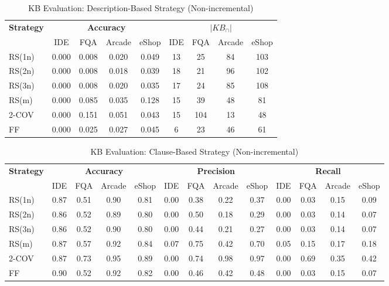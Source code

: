 \documentclass[11pt]{article}
\begin{document}
\begin{table}[htbp]
\centering
\caption{KB Evaluation: Description-Based Strategy (Non-incremental)}
\label{tab:kb_eval_desc}
\begin{tabular}{l|cccc|cccc}
\toprule
\multirow{2}{*}{\textbf{Strategy}}
    & \multicolumn{4}{c|}{\textbf{Accuracy}}
    & \multicolumn{4}{c}{\textbf{$|KB_\cap|$}} \\
    & IDE & FQA & Arcade & eShop
    & IDE & FQA & Arcade & eShop \\
\midrule
RS(1n) & 0.000 & 0.008 & 0.020 & 0.049 & 13 & 25 & 84 & 103 \\
RS(2n) & 0.000 & 0.008 & 0.018 & 0.039 & 18 & 21 & 96 & 102 \\
RS(3n) & 0.000 & 0.008 & 0.020 & 0.035 & 17 & 24 & 85 & 108 \\
RS(m)  & 0.000 & 0.085 & 0.035 & 0.128 & 15 & 39 & 48 & 81 \\
2-COV  & 0.000 & 0.151 & 0.051 & 0.043 & 15 & 104 & 13 & 48 \\
FF     & 0.000 & 0.025 & 0.027 & 0.045 & 6 & 23 & 46 & 61 \\
\bottomrule
\end{tabular}
\end{table}

\begin{table}[htbp]
\centering
\caption{KB Evaluation: Clause-Based Strategy (Non-incremental)}
\label{tab:kb_eval_clause}
\begin{tabular}{l|cccc|cccc|cccc}
\toprule
\multirow{2}{*}{\textbf{Strategy}}
    & \multicolumn{4}{c|}{\textbf{Accuracy}}
    & \multicolumn{4}{c|}{\textbf{Precision}}
    & \multicolumn{4}{c}{\textbf{Recall}} \\
    & IDE & FQA & Arcade & eShop
    & IDE & FQA & Arcade & eShop
    & IDE & FQA & Arcade & eShop \\
\midrule
RS(1n) & 0.87 & 0.51 & 0.90 & 0.81 & 0.00 & 0.38 & 0.22 & 0.37 & 0.00 & 0.03 & 0.15 & 0.09 \\
RS(2n) & 0.86 & 0.52 & 0.89 & 0.80 & 0.00 & 0.50 & 0.18 & 0.29 & 0.00 & 0.03 & 0.14 & 0.07 \\
RS(3n) & 0.86 & 0.52 & 0.90 & 0.80 & 0.00 & 0.44 & 0.21 & 0.27 & 0.00 & 0.03 & 0.14 & 0.07 \\
RS(m)  & 0.87 & 0.57 & 0.92 & 0.84 & 0.07 & 0.75 & 0.42 & 0.70 & 0.05 & 0.15 & 0.17 & 0.18 \\
2-COV  & 0.87 & 0.73 & 0.95 & 0.89 & 0.00 & 0.74 & 0.98 & 0.97 & 0.00 & 0.69 & 0.35 & 0.42 \\
FF     & 0.90 & 0.52 & 0.92 & 0.82 & 0.00 & 0.46 & 0.42 & 0.48 & 0.00 & 0.03 & 0.15 & 0.07 \\
\bottomrule
\end{tabular}
\end{table}
\end{document}
